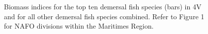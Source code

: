\documentclass[11pt]{book}
\begin{document}
\begin{figure}[htb]

{\centering {} 

}

\caption{Biomass indices for the top ten demersal fish species (bars) in 4V and for all other demersal fish species combined. Refer to Figure 1 for NAFO divisions within the Maritimes Region.}\label{fig:6-fig-biomass4V}
\end{figure}
\clearpage
\end{document}
